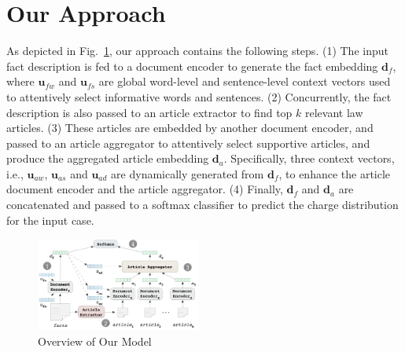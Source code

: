 


\section{Our Approach}
As depicted in Fig.~\ref{fig_model_framework}, our approach contains the following steps.
(1) The input fact description is fed to a document encoder to generate the fact embedding $\mathbf{d}_f$, where $\mathbf{u}_{fw}$ and $\mathbf{u}_{fs}$ are global word-level and sentence-level context vectors used to attentively select informative words and sentences.
(2) Concurrently, the fact description is also passed to an article extractor to find top $k$ relevant law articles. 
(3) These articles are embedded by another document encoder, and  passed to an article aggregator to attentively select supportive articles, and produce the aggregated article embedding $\mathbf{d}_a$. Specifically, three context vectors, i.e., $\mathbf{u}_{aw}$, $\mathbf{u}_{as}$ and $\mathbf{u}_{ad}$ are dynamically generated from $\mathbf{d}_f$, to enhance the article document encoder and the article aggregator. 
(4) Finally, $\mathbf{d}_f$ and $\mathbf{d}_a$ are concatenated and passed to a softmax classifier to predict the charge distribution for the input case.


\begin{figure}[t!]
\begin{center}
\includegraphics[width=0.48\textwidth]{figures/charge_pred_overview.png}	
\caption{Overview of Our Model}
\label{fig_model_framework}
\end{center}
\vspace{-1em}
\end{figure}

